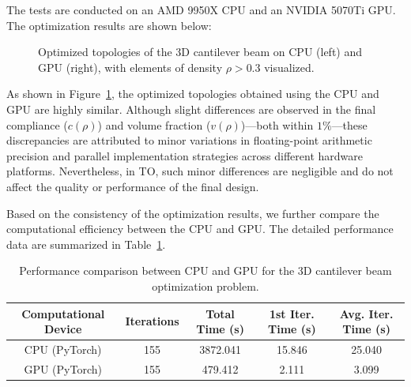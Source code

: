 \documentclass[mathpazo]{cicp}
\begin{document}
The tests are conducted on an AMD 9950X CPU and an NVIDIA 5070Ti GPU. The optimization results are shown below:
\begin{figure}[htp]
	\centering
	\caption{Optimized topologies of the 3D cantilever beam on CPU (left) and GPU (right), with elements of density $\rho > 0.3$ visualized.}
	\label{fig:canti3d_device_compare}
\end{figure}

As shown in Figure~\ref{fig:canti3d_device_compare}, the optimized topologies obtained using the CPU and GPU are highly similar. Although slight differences are observed in the final compliance ($c(\rho)$) and volume fraction ($v(\rho)$)—both within $1\%$---these discrepancies are attributed to minor variations in floating-point arithmetic precision and parallel implementation strategies across different hardware platforms. Nevertheless, in TO, such minor differences are negligible and do not affect the quality or performance of the final design.

Based on the consistency of the optimization results, we further compare the computational efficiency between the CPU and GPU. The detailed performance data are summarized in Table~\ref{tab:device_performance}.
\begin{table}[htbp]
	\centering
	\setlength{\tabcolsep}{4pt} %
	\caption{Performance comparison between CPU and GPU for the 3D cantilever beam optimization problem.}
	\begin{tabular}{ccccc}
		\toprule
		\textbf{Computational Device} & \textbf{Iterations} & \textbf{Total Time (s)} & \textbf{1st Iter. Time (s)} & \textbf{Avg. Iter. Time (s)} \\
		\midrule
		CPU (PyTorch) & 155 & 3872.041 & 15.846 & 25.040 \\
		GPU (PyTorch) & 155 & 479.412 & 2.111 & 3.099 \\
		\bottomrule
	\end{tabular}
	\label{tab:device_performance}
\end{table}
\end{document}
